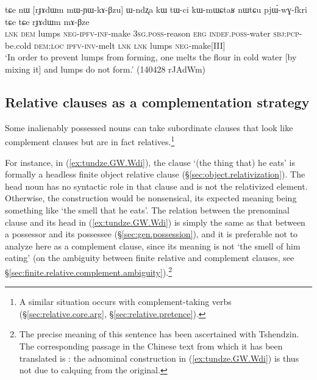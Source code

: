 \begin{exe}
\ex  \label{ex:mWYWkABzu.Wndzxa}
\gll tɕe nɯ [rɟɤdɯm mɯ-ɲɯ-kɤ-βzu] ɯ-ndʐa kɯ tɯ-ci kɯ-mɯɕtaʁ nɯtɕu pjɯ́-wɣ-fkri tɕe tɕe rɟɤdɯm mɤ-βze \\
\textsc{lnk} \textsc{dem} lumps  \textsc{neg}-\textsc{ipfv}-\textsc{inf}-make \textsc{3sg}.\textsc{poss}-reason \textsc{erg} \textsc{indef}.\textsc{poss}-water \textsc{sbj}:\textsc{pcp}-be.cold \textsc{dem}:\textsc{loc} \textsc{ipfv}-\textsc{inv}-melt \textsc{lnk} \textsc{lnk} lumps \textsc{neg}-make[III] \\
\glt `In order to prevent lumps from forming, one melts the flour in cold water [by mixing it] and lumps do not form.' (140428 rJAdWm)
\end{exe} 

\subsection{Relative clauses as a complementation strategy} \label{sec:relative.clause.compl.strategy}
Some inalienably possessed nouns can take subordinate clauses that look like complement clauses but are in fact relatives.\footnote{A similar situation occurs with complement-taking verbs (§\ref{sec:relative.core.arg}, §\ref{sec:relative.pretence}). }

For instance, in (\ref{ex:tundze.GW.Wdi}), the clause  `(the thing that) he eats' is formally a headless finite object relative clause (§\ref{sec:object.relativization}). The head noun  has no syntactic role in that clause and is not the relativized element. Otherwise, the construction would be nonsensical, its expected meaning being something like `the smell that he eats'. The relation between the prenominal clause and its head in (\ref{ex:tundze.GW.Wdi}) is simply the same as that between a possessor and its possessee (§\ref{sec:gen.possession}), and it is preferable not to analyze here  as a complement clause, since its meaning is not `the smell of him eating' (on the ambiguity between finite relative and complement clauses, see §\ref{sec:finite.relative.complement.ambiguity}).\footnote{The precise meaning of this sentence has been ascertained with Tshendzin. The corresponding passage in the Chinese text from which it has been translated is : the adnominal construction in (\ref{ex:tundze.GW.Wdi}) is thus not due to calquing from the original. }

